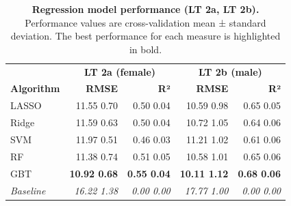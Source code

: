 \documentclass[
  oneside]{book}
\begin{document}
\begin{table}

\caption{\label{tab:09-performance-2}\textbf{Regression model performance (LT 2a, LT 2b).} Performance values are cross-validation mean ± standard deviation. The best performance for each measure is highlighted in bold.}
\centering
\begin{tabular}[t]{lrrrr}
\toprule
\multicolumn{1}{c}{\textbf{ }} & \multicolumn{2}{c}{\textbf{LT 2a (female)}} & \multicolumn{2}{c}{\textbf{LT 2b (male)}} \\
\cmidrule(l{3pt}r{3pt}){2-3} \cmidrule(l{3pt}r{3pt}){4-5}
\textbf{Algorithm} & \textbf{RMSE} & \textbf{R²} & \textbf{RMSE} & \textbf{R²}\\
\midrule
LASSO & 11.55 \textpm{} 0.70 & 0.50 \textpm{} 0.04 & 10.59 \textpm{} 0.98 & 0.65 \textpm{} 0.05\\
Ridge & 11.59 \textpm{} 0.63 & 0.50 \textpm{} 0.04 & 10.72 \textpm{} 1.05 & 0.64 \textpm{} 0.06\\
SVM & 11.97 \textpm{} 0.51 & 0.46 \textpm{} 0.03 & 11.21 \textpm{} 1.02 & 0.61 \textpm{} 0.06\\
RF & 11.38 \textpm{} 0.74 & 0.51 \textpm{} 0.05 & 10.58 \textpm{} 1.01 & 0.65 \textpm{} 0.06\\
GBT & \textbf{10.92 \textpm{} 0.68} & \textbf{0.55 \textpm{} 0.04} & \textbf{10.11 \textpm{} 1.12} & \textbf{0.68 \textpm{} 0.06}\\
\midrule
\addlinespace
\em{Baseline} & \em{16.22 \textpm{} 1.38} & \em{0.00 \textpm{} 0.00} & \em{17.77 \textpm{} 1.00} & \em{0.00 \textpm{} 0.00}\\
\bottomrule
\end{tabular}
\end{table}
\end{document}
